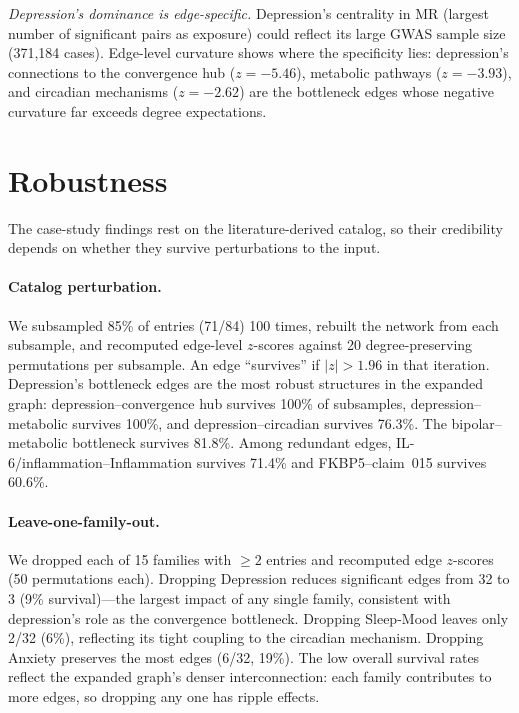 \documentclass[11pt]{article}
\begin{document}
\emph{Depression's dominance is edge-specific.} Depression's centrality in MR (largest number of significant pairs as exposure) could reflect its large GWAS sample size (371,184 cases). Edge-level curvature shows where the specificity lies: depression's connections to the convergence hub ($z = -5.46$), metabolic pathways ($z = -3.93$), and circadian mechanisms ($z = -2.62$) are the bottleneck edges whose negative curvature far exceeds degree expectations.

\section{Robustness}
\label{sec:robustness}

The case-study findings rest on the literature-derived catalog, so their credibility depends on whether they survive perturbations to the input.

\paragraph{Catalog perturbation.} We subsampled 85\% of entries (71/84) 100 times, rebuilt the network from each subsample, and recomputed edge-level $z$-scores against 20 degree-preserving permutations per subsample. An edge ``survives'' if $|z| > 1.96$ in that iteration. Depression's bottleneck edges are the most robust structures in the expanded graph: depression--convergence hub survives 100\% of subsamples, depression--metabolic survives 100\%, and depression--circadian survives 76.3\%. The bipolar--metabolic bottleneck survives 81.8\%. Among redundant edges, IL-6/inflammation--Inflammation survives 71.4\% and FKBP5--claim~015 survives 60.6\%.

\paragraph{Leave-one-family-out.} We dropped each of 15 families with $\geq 2$ entries and recomputed edge $z$-scores (50 permutations each). Dropping Depression reduces significant edges from 32 to 3 (9\% survival)---the largest impact of any single family, consistent with depression's role as the convergence bottleneck. Dropping Sleep-Mood leaves only 2/32 (6\%), reflecting its tight coupling to the circadian mechanism. Dropping Anxiety preserves the most edges (6/32, 19\%). The low overall survival rates reflect the expanded graph's denser interconnection: each family contributes to more edges, so dropping any one has ripple effects.
\end{document}
